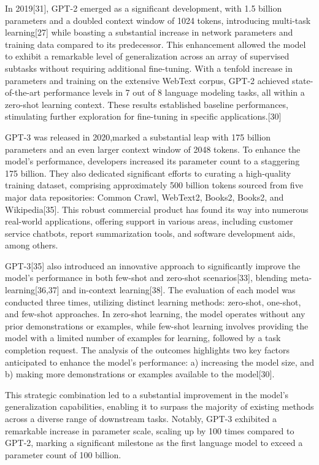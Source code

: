 \documentclass[fleqn,10pt]{thescipub} %
\begin{document}
In 2019[31], GPT-2 emerged as a significant development, with 1.5 billion parameters and a doubled context window of 1024 tokens, introducing multi-task learning[27] while boasting a substantial increase in network parameters and training data compared to its predecessor. This enhancement allowed the model to exhibit a remarkable level of generalization across an array of supervised subtasks without requiring additional fine-tuning. With a tenfold increase in parameters and training on the extensive WebText corpus, GPT-2 achieved state-of-the-art performance levels in 7 out of 8 language modeling tasks, all within a zero-shot learning context. These results established baseline performances, stimulating further exploration for fine-tuning in specific applications.[30]

GPT-3 was released in 2020,marked a substantial leap with 175 billion parameters and an even larger context window of 2048 tokens. To enhance the model's performance, developers increased its parameter count to a staggering 175 billion. They also dedicated significant efforts to curating a high-quality training dataset, comprising approximately 500 billion tokens sourced from five major data repositories: Common Crawl, WebText2, Books2, Books2, and Wikipedia[35]. This robust commercial product has found its way into numerous real-world applications, offering support in various areas, including customer service chatbots, report summarization tools, and software development aids, among others.

GPT-3[35] also introduced an innovative approach to significantly improve the model's performance in both few-shot and zero-shot scenarios[33], blending meta-learning[36,37] and in-context learning[38]. The evaluation of each model was conducted three times, utilizing distinct learning methods: zero-shot, one-shot, and few-shot approaches. In zero-shot learning, the model operates without any prior demonstrations or examples, while few-shot learning involves providing the model with a limited number of examples for learning, followed by a task completion request. The analysis of the outcomes highlights two key factors anticipated to enhance the model's performance: a) increasing the model size, and b) making more demonstrations or examples available to the model[30].

This strategic combination led to a substantial improvement in the model's generalization capabilities, enabling it to surpass the majority of existing methods across a diverse range of downstream tasks. Notably, GPT-3 exhibited a remarkable increase in parameter scale, scaling up by 100 times compared to GPT-2, marking a significant milestone as the first language model to exceed a parameter count of 100 billion.
\end{document}
